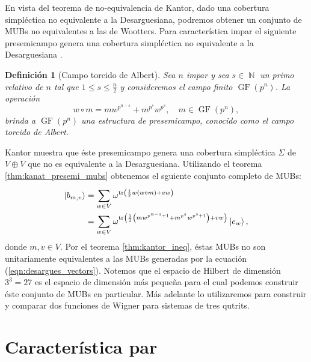 \documentclass[a4paper]{report}
\DeclareMathOperator{\N}{\mathbb{N}}
\DeclareMathOperator{\tr}{tr}
\DeclareMathOperator{\GF}{GF}
\newtheorem{definition}{Definición}
\begin{document}
  En vista del teorema de no-equivalencia de Kantor, dado
  una cobertura simpléctica no equivalente a la
  Desarguesiana, podremos obtener un conjunto de MUBs no
  equivalentes a las de Wootters. Para característica impar
  el siguiente presemicampo genera una cobertura simpléctica
  no equivalente a la Desarguesiana \cite{kantor1982}.
  \begin{definition}[Campo torcido de Albert]
    \label{def:alberts_spread}
    Sea $n$ impar y sea $s \in \N$ un primo relativo de $n$
    tal que $1 \leq s \leq \frac{n}{2}$ y consideremos el
    campo finito $\GF(p^{n})$. La operación
    \begin{equation}
      w \circ m
      = mw^{p^{n-s}} + m^{p^{s}} w^{p^{s}},
      \quad m \in \GF(p^{n}),
    \end{equation}
    brinda a $\GF(p^{n})$ una estructura de presemicampo,
    conocido como el campo torcido de Albert.
  \end{definition}
  Kantor muestra que éste presemicampo genera una cobertura
  simpléctica $\Sigma$ de $V \oplus V$ que no es equivalente
  a la Desarguesiana. Utilizando el teorema
  \ref{thm:kanat_presemi_mubs} obtenemos el sguiente
  conjunto completo de MUBs:
  \begin{align}
    \ket{b_{m,v}}
    &= \sum_{w \in V}^{}
    \omega^{\tr\left(
      \frac{1}{2} w (w \circ m) + a w
    \right) } \\
    &= \sum_{w \in V}^{}
    \omega^{\tr\left(
      \frac{1}{2}
      \left(
        mw^{p^{n-s}+1} + m^{p^{s}}w^{p^{s}+1}
      \right) + v w
    \right) } \ket{e_w},
  \end{align}
  donde $m, v \in V$. Por el teorema \ref{thm:kantor_ineq},
  éstas MUBs no son unitariamente equivalentes a las MUBs
  generadas por la ecuación (\ref{eqn:desargues_vectors}).
  Notemos que el espacio de Hilbert de dimensión $3^{3} =
  27$ es el espacio de dimensión más pequeña para el cual
  podemos construir éste conjunto de MUBs en particular. Más
  adelante lo utilizaremos para construir y comparar dos
  funciones de Wigner para sistemas de tres qutrits.
    
  \section{Característica par}
\end{document}
